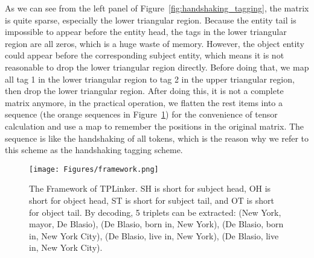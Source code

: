 \documentclass[11pt]{article}
\begin{document}
As we can see from the left panel of Figure~\ref{fig:handshaking_tagging}, the matrix is quite sparse, especially the lower triangular region. Because the entity tail is impossible to appear before the entity head, the tags in the lower triangular region are all zeros, which is a huge waste of memory. 
However, the object entity could appear before the corresponding subject entity,
which means it is not reasonable to drop the lower triangular region directly. Before doing that, we map all tag 1 in the lower triangular region to tag 2 in the upper triangular region, then drop the lower triangular region.
After doing this, it is not a complete matrix anymore, in 
the practical operation, we flatten the rest items into a sequence (the orange sequences in Figure~\ref{fig:framework}) for the convenience of tensor calculation and use a map to remember the positions in the original matrix. 
The sequence is like the handshaking of all tokens, which is the reason why we refer to this scheme as the handshaking tagging scheme. 

\begin{figure}[t]
    \centering
    \texttt{[image: Figures/framework.png]}
    \caption{The Framework of TPLinker. 
    SH is short for subject head, OH is short for object head, ST is short for subject tail, and OT is short for object tail. By decoding, 5 triplets can be extracted: (New York, mayor, De Blasio), (De Blasio, born in, New York), (De Blasio, born in, New York City), (De Blasio, live in, New York), (De Blasio, live in, New York City).
}
    \label{fig:framework}
\vspace{-0.1in}
\end{figure}
\end{document}
